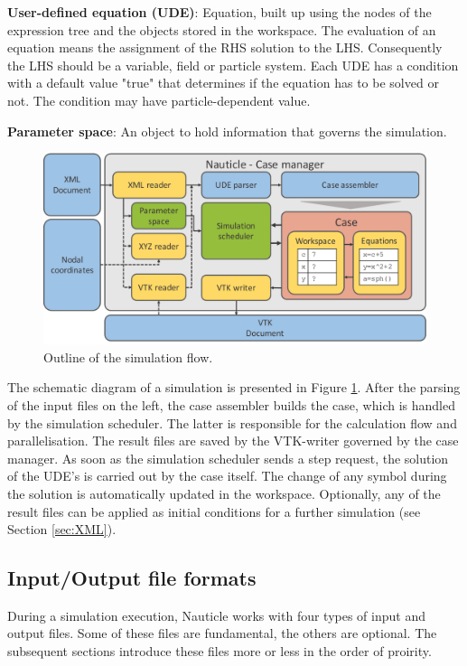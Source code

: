 \documentclass[a4paper,12pt,openany]{book}
\theoremstyle{break}
\begin{document}
\textbf{User-defined equation (UDE)}: Equation, built up using the nodes of the expression tree and the objects stored in the workspace. The evaluation of an equation means the assignment of the RHS solution to the LHS. Consequently the LHS should be a variable, field or particle system. Each UDE has a condition with a default value "true" that determines if the equation has to be solved or not. The condition may have particle-dependent value.

\textbf{Parameter space}: An object to hold information that governs the simulation.

\begin{figure}[h!]
  \includegraphics[scale=0.55]{workflow.pdf}
  \centering
  \caption{Outline of the simulation flow.}
  \label{fig:workflow}
\end{figure}\vspace*{3pt}

The schematic diagram of a simulation is presented in Figure \ref{fig:workflow}. After the parsing of the input files on the left, the case assembler builds the case, which is handled by the simulation scheduler. The latter is responsible for the calculation flow and parallelisation. The result files are saved by the VTK-writer governed by the case manager. 
As soon as the simulation scheduler sends a step request, the solution of the UDE's is carried out by the case itself. The change of any symbol during the solution is automatically updated in the workspace. Optionally, any of the result files can be applied as initial conditions for a further simulation (see Section \ref{sec:XML}).

\subsection{Input/Output file formats}
During a simulation execution, Nauticle works with four types of input and output files. Some of these files are fundamental, the others are optional. The subsequent sections introduce these files more or less in the order of proirity.
\end{document}
